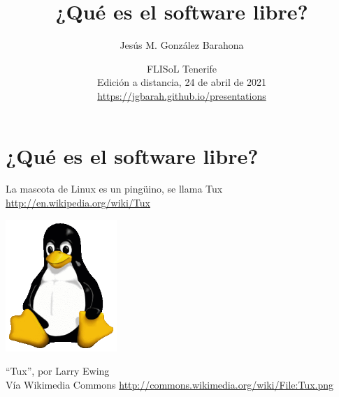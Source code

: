 \documentclass[17pt,aspectratio=169]{beamer}
\begin{document}
\title{¿Qué es el software libre?}
\author{Jesús M. González Barahona}

\date{FLISoL Tenerife \\
  Edición a distancia, 24 de abril de 2021\\
{\small \url{https://jgbarah.github.io/presentations}} \\}

\frame{
\maketitle
}




\section{¿Qué es el software libre?}


\begin{frame}

{\small
La mascota de Linux es un pingüino, se llama Tux \\
\url{http://en.wikipedia.org/wiki/Tux} \\
}

\begin{flushright}
\includegraphics[height=5cm]{figs/tux}

{\footnotesize
``Tux'', por Larry Ewing \\
  Vía Wikimedia Commons \url{http://commons.wikimedia.org/wiki/File:Tux.png}
}
\end{flushright}

\end{frame}
\end{document}
